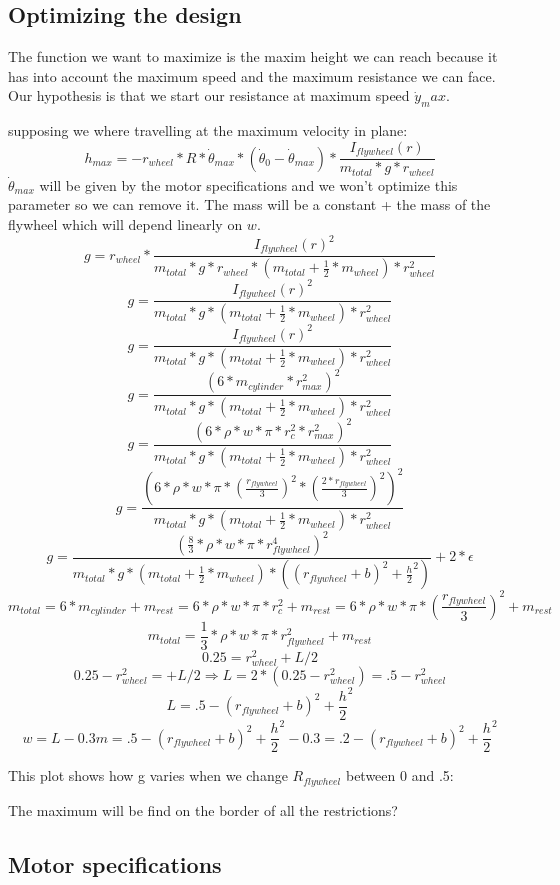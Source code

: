 \subsection{Optimizing the design}
The function we want to maximize is the maxim height we can reach because it has into account the maximum speed and the maximum resistance we can face.
Our hypothesis is that we start our resistance at maximum speed $\dot{y}_max$.

supposing we where travelling at the maximum velocity in plane:
\[h_{max}= - r_{wheel} * R * \dot{\theta}_{max} * (\dot{\theta}_0-\dot{\theta}_{max}) * \frac{I_{flywheel}(r)}{m_{total} * g * r_{wheel}}\]
$\dot{\theta}_{max}$ will be given by the motor specifications and we won't optimize this parameter so we can remove it.
The mass will be a constant + the mass of the flywheel which will depend linearly on $w$.
\[g= r_{wheel} * \frac{I_{flywheel}(r)^2}{m_{total} * g * r_{wheel}*(m_{total} + \frac{1}{2} *m_{wheel}) * r_{wheel}^2}\]
\[g= \frac{I_{flywheel}(r)^2}{m_{total} * g * (m_{total} + \frac{1}{2} *m_{wheel}) * r_{wheel}^2}\]
\[g= \frac{I_{flywheel}(r)^2}{m_{total} * g * (m_{total} + \frac{1}{2} *m_{wheel}) * r_{wheel}^2}\]
\[g= \frac{(6 * m_{cylinder} * r_{max}^2)^2}{m_{total} * g * (m_{total} + \frac{1}{2} *m_{wheel}) * r_{wheel}^2}\]
\[g= \frac{(6 * \rho * w * \pi * r_c^2* r_{max}^2)^2}{m_{total} * g * (m_{total} + \frac{1}{2} *m_{wheel}) * r_{wheel}^2}\]
\[g= \frac{(6 * \rho * w * \pi * (\frac{r_{flywheel}}{3})^2* (\frac{2*r_{flywheel}}{3})^2)^2}{m_{total} * g * (m_{total} + \frac{1}{2} *m_{wheel}) * r_{wheel}^2}\]
\[g= \frac{(\frac{8}{3} * \rho * w * \pi * r_{flywheel}^4)^2}{m_{total} * g * (m_{total} + \frac{1}{2} *m_{wheel}) * ((r_{flywheel} + b)^2+\frac{h}{2}^2)} + 2*\epsilon\]
\[m_{total} =6* m_{cylinder}+m_{rest} = 6 * \rho * w * \pi * r_c^2 + m_{rest} = 6 * \rho * w * \pi * (\frac{r_{flywheel}}{3})^2 + m_{rest} \]
\[m_{total} =\frac{1}{3} * \rho * w * \pi * r_{flywheel}^2 + m_{rest} \]
\[0.25 = r_{wheel}^2 + L/2\]
\[0.25 - r_{wheel}^2 =  + L/2 \Rightarrow L=2*(0.25-r_{wheel}^2) = .5-r_{wheel}^2\]
\[ L = .5-(r_{flywheel} + b)^2+\frac{h}{2}^2 \]
\[w = L - 0.3m = .5-(r_{flywheel} + b)^2+\frac{h}{2}^2 -0.3 = .2-(r_{flywheel} + b)^2+\frac{h}{2}^2\]

This plot shows how g varies when we change $R_{flywheel}$ between 0 and .5:


The maximum will be find on the border of all the restrictions?



\subsection{Motor specifications}

